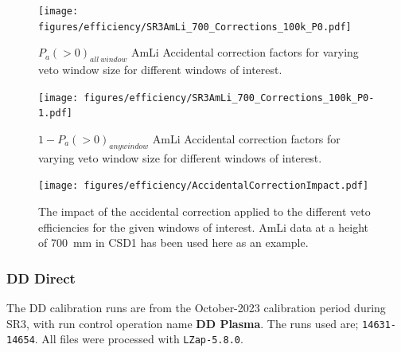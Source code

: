 \begin{figure}
    \centering
    \texttt{[image: figures/efficiency/SR3AmLi\_700\_Corrections\_100k\_P0.pdf]}
    \caption{$P_a(>0)_{all\:window}$ AmLi Accidental correction factors for varying veto window size for different windows of interest.}
    \label{fig:AccCorr}
\end{figure}

\begin{figure}
    \centering
    \texttt{[image: figures/efficiency/SR3AmLi\_700\_Corrections\_100k\_P0-1.pdf]}
    \caption{$1 - P_a(>0)_{any window}$ AmLi Accidental correction factors for varying veto window size for different windows of interest.}
    \label{fig:AccCorr}
\end{figure}

\begin{figure}
    \centering
    \texttt{[image: figures/efficiency/AccidentalCorrectionImpact.pdf]}
    \caption{The impact of the accidental correction applied to the different veto efficiencies for the given windows of interest. AmLi data at a height of 700~mm in CSD1 has been used here as an example.}
    \label{fig:AccidentalImpact}
\end{figure}


\subsubsection{DD Direct}
The DD calibration runs are from the October-2023 calibration period during SR3, with run control operation name \textbf{DD Plasma}.
The runs used are; \lstinline{14631-14654}.
All files were processed with \lstinline{LZap-5.8.0}.

